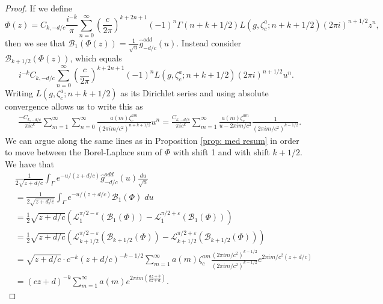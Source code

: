 \documentclass[12pt]{amsart}
\theoremstyle{definition}
\theoremstyle{plain}
\numberwithin{equation}{section}
\begin{document}
\begin{proof}
If we define
\[\Phi(z) =C_{k, -d/c}\frac{i^{-k}}{\pi} \sum_{n=0}^\infty \left(\frac{c}{2\pi}\right)^{k+2n+1} (-1)^n\Gamma(n+k+1/2)L(g, \zeta_c^{a}; n+k+1/2)(2\pi i)^{n+1/2}z^n,
\]
then we see that $\mathcal{B}_1(\Phi(z)) = \frac{1}{\sqrt{u}}\widehat{g}_{-d/c}^{odd}(u)$. Instead consider $\mathcal{B}_{k+1/2}(\Phi(z))$, which equals 
\[i^{-k} C_{k, -d/c}\sum_{n=0}^\infty \left(\frac{c}{2\pi}\right)^{k+2n+1} (-1)^nL(g, \zeta_c^{a}; n+k+1/2)(2\pi i)^{n+1/2}u^n.
\]
Writing $L(g, \zeta_c^{a}; n+k+1/2)$ as its Dirichlet series and using absolute convergence allows us to write this as 
\begin{align*}&\frac{-C_{k, -d/c}}{\pi i c^k} \sum_{m=1}^\infty \sum_{n=0}^\infty \frac{a(m)\zeta_c^{am}}{(2\pi i m/c^2)^{n+k+1/2}}u^n = \frac{C_{k, -d/c}}{\pi i c^k}\sum_{m=1}^\infty  \frac{a(m)\zeta_c^{am}}{u - 2\pi i m/c^2}\frac{1}{(2\pi i m/c^2)^{k-1/2}}.
\end{align*}
We can argue along the same lines as in Proposition \ref{prop: med resum} in order to move between the Borel-Laplace sum of $\Phi$ with shift 1 and with shift $k+1/2$. We have that
\begin{align*}
&\frac{1}{2\sqrt{z+d/c}} \int_{\Gamma}e^{-u/(z+d/c)}\widehat{g}_{-d/c}^{odd}(u)\frac{du}{\sqrt{u}}\\
&= \frac{1}{2\sqrt{z+d/c}} \int_{\Gamma}e^{-u/(z+d/c)}\mathcal{B}_1(\Phi)\;du\\
&= \frac{1}{2}\sqrt{z+d/c}\left( \mathcal{L}_{1}^{\pi/2-\varepsilon}(\mathcal{B}_1(\Phi)) - \mathcal{L}_{1}^{\pi/2+\varepsilon}(\mathcal{B}_1(\Phi))\right) \\
&= \frac{1}{2}\sqrt{z+d/c}\left( \mathcal{L}_{k+1/2}^{\pi/2-\varepsilon}(\mathcal{B}_{k+1/2}(\Phi)) - \mathcal{L}_{k+1/2}^{\pi/2+\varepsilon}(\mathcal{B}_{k+1/2}(\Phi))\right)\\
&= \sqrt{z+d/c}\cdot c^{-k} (z+d/c)^{-k-1/2} \sum_{m=1}^\infty a(m)\zeta_c^{am}\frac{(2\pi i m/c^2)^{k-1/2}}{(2\pi i m/c^2)^{k-1/2}} e^{2\pi i m/c^2(z+d/c)}\\
&= (cz+d)^{-k}\sum_{m=1}^\infty a(m) e^{2\pi i m\left(\frac{az+b}{cz+d}\right)}.
\end{align*}


\end{proof}
\end{document}
